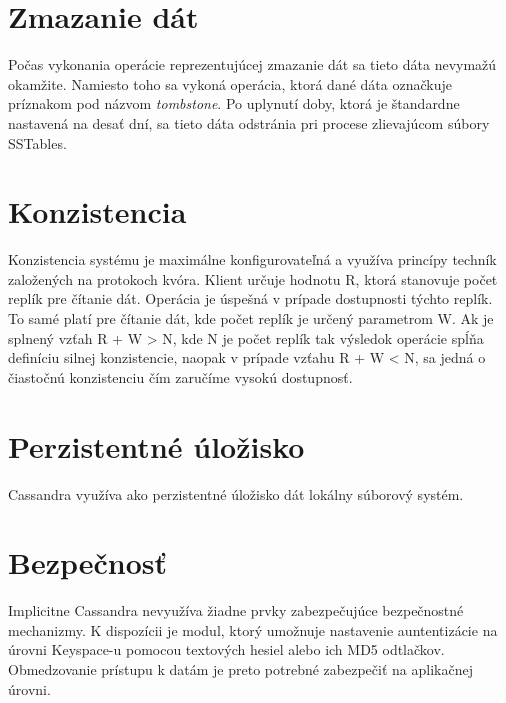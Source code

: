\documentclass[11pt,twoside,a4paper]{book}
\begin{document}
\section{Zmazanie dát}
Počas vykonania operácie reprezentujúcej zmazanie dát sa tieto dáta nevymažú okamžite. Namiesto toho sa vykoná operácia, ktorá dané dáta označkuje príznakom pod názvom \emph{tombstone}. Po uplynutí doby, ktorá je štandardne nastavená na desať dní, sa tieto dáta odstránia pri procese zlievajúcom súbory SSTables.
 

\section{Konzistencia}

Konzistencia systému je maximálne konfigurovateľná a využíva princípy techník založených na protokoch kvóra. Klient určuje hodnotu R, ktorá stanovuje počet replík pre čítanie dát. Operácia je úspešná v prípade dostupnosti týchto replík. To samé platí pre čítanie dát, kde počet replík je určený parametrom W. Ak je splnený vzťah R + W > N, kde N je počet replík tak výsledok operácie spĺňa definíciu silnej konzistencie, naopak v prípade vzťahu R + W < N, sa jedná o čiastočnú konzistenciu čím zaručíme vysokú dostupnosť.


\section{Perzistentné úložisko}

Cassandra využíva ako perzistentné úložisko dát lokálny súborový systém.


\section{Bezpečnosť}

Implicitne Cassandra nevyužíva žiadne prvky zabezpečujúce bezpečnostné mechanizmy. K dispozícii je modul, ktorý umožnuje nastavenie auntentizácie na úrovni Keyspace-u pomocou textových hesiel alebo ich MD5 odtlačkov. Obmedzovanie prístupu k datám je preto potrebné zabezpečiť na aplikačnej úrovni.



\end{document}
